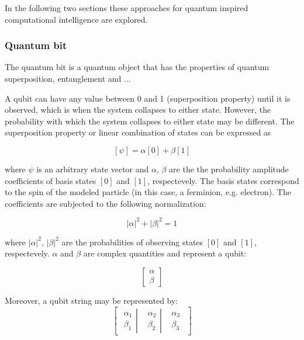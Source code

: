 In the following two sections these approaches for quantum inspired computational intelligence are explored.

\subsubsection{Quantum bit}

The quantum bit is a quantum object that has the properties of quantum superposition, entanglement and ...


A qubit can have any value between 0 and 1 (superposition property) until it is observed, which is when the system collapses to either state. However, the probability with which the system collapses to either state  may be different. The superposition property or linear combination of states can be expressed as

$$
[\psi] = \alpha[0] + \beta[1]
$$

where $\psi$ is an arbitrary state vector and $\alpha$, $\beta$ are the the probability amplitude coefficients of basis states $[0]$ and $[1]$, respectevely. The basis states correspond to the spin of the modeled particle (in this case, a ferminion, e.g. electron). The coefficients are subjected to the following normalization:

$$|\alpha|^2 + |\beta|^2 = 1$$

where $|\alpha|^2$, $|\beta|^2$ are the probabilities of observing states $[0]$ and $[1]$, respectevely. $\alpha$ and $\beta$ are complex quantities and represent a qubit:

$$\begin{bmatrix}
\alpha \\
\beta
\end{bmatrix}$$

Moreover, a qubit string may be represented by:
$$
\begin{bmatrix}
\left.\begin{matrix}
\alpha_1\\ 
\beta_1
\end{matrix}\right| & \left.\begin{matrix}
\alpha_2\\ 
\beta_2
\end{matrix}\right| & \begin{matrix}
\alpha_3\\ 
\beta_3
\end{matrix}
\end{bmatrix}
$$

